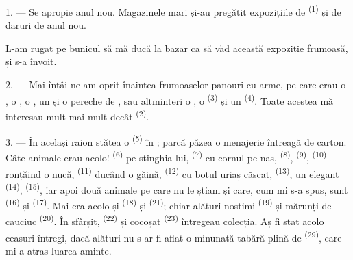 %
%

\VUsaut{4.0mm}
\VUsaut{2.0mm}
\VUsaut{3.4mm}

1. --- Se apropie anul nou. Magazinele mari și-au pregătit expozițiile de
 \textsuperscript{(1)} și de daruri de anul nou.

L-am rugat pe bunicul să mă ducă la bazar ca să văd această expoziție frumoasă, și
s-a învoit.

2. --- Mai întâi ne-am oprit înaintea frumoaselor panouri cu arme, pe care erau o
, o , o , un  și o
pereche de , sau altminteri o , o 
\textsuperscript{(3)} și un  \textsuperscript{(4)}. Toate acestea mă
interesau mult mai mult decât  \textsuperscript{(2)}.

\VUsaut{3.0mm}
\VUsaut{2.6mm}

3. --- În același raion stătea o  \textsuperscript{(5)} în
; parcă păzea o menajerie întreagă de carton. Câte animale erau
acolo!  \textsuperscript{(6)} pe stinghia lui,
 \textsuperscript{(7)} cu cornul pe nas, 
\textsuperscript{(8)},  \textsuperscript{(9)}, 
\textsuperscript{(10)} ronțăind o nucă,  \textsuperscript{(11)}
ducând o găină,  \textsuperscript{(12)} cu botul uriaș căscat,
 \textsuperscript{(13)}, un  elegant
\textsuperscript{(14)},  \textsuperscript{(15)}, iar apoi două
animale pe care nu le știam și care, cum mi s-a spus, sunt 
\textsuperscript{(16)} și  \textsuperscript{(17)}. Mai era acolo și
 \textsuperscript{(18)} și 
\textsuperscript{(21)}; chiar alături  nostimi
\textsuperscript{(19)} și  mărunți de cauciuc
\textsuperscript{(20)}. În sfârșit,  \textsuperscript{(22)} și
 cocoșat \textsuperscript{(23)} întregeau colecția. Aș fi stat
acolo ceasuri întregi, dacă alături nu s-ar fi aflat o minunată tabără plină de
 \textsuperscript{(29)}, care mi-a atras luarea-aminte.

